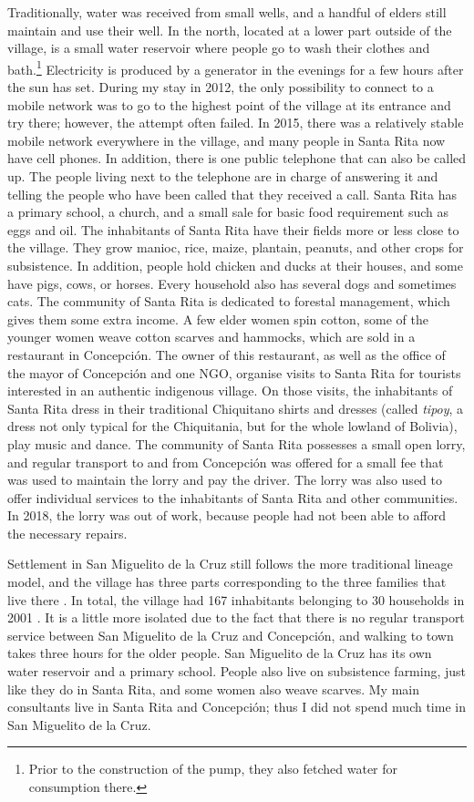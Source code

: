 Traditionally, water was received from small wells, and a handful of elders still maintain and use their well. In the north, located at a lower part outside of the village, is a small water reservoir where people go to wash their clothes and bath.\footnote{Prior to the construction of the pump, they also fetched water for consumption there.}   Electricity is produced by a generator in the evenings for a few hours after the sun has set. During my stay in 2012, the only possibility to connect to a mobile network was to go to the highest point of the village at its entrance and try there; however, the attempt often failed. In 2015, there was a relatively stable mobile network everywhere in the village, and many people in Santa Rita now have cell phones. In addition, there is one public telephone that can also be called up. The people living next to the telephone are in charge of answering it and telling the people who have been called that they received a call. Santa Rita has a primary school, a church, and a small sale for basic food requirement such as eggs and oil.
The inhabitants of Santa Rita have their fields more or less close to the village. They grow manioc, rice, maize, plantain, peanuts, and other crops for subsistence. In addition, people hold chicken and ducks at their houses, and some have pigs, cows, or horses. Every household also has several dogs and sometimes cats. The community of Santa Rita is dedicated to forestal management, which gives them some extra income. A few elder women spin cotton, some of the younger women weave cotton scarves and hammocks, which are sold in a restaurant in Concepción. The owner of this restaurant, as well as the office of the mayor of Concepción and one NGO, organise visits to Santa Rita for tourists interested in an authentic indigenous village. On those visits, the inhabitants of Santa Rita dress in their traditional Chiquitano shirts and dresses (called \textit{tipoy}, a dress not only typical for the Chiquitania, but for the whole lowland of Bolivia), play music and dance. 
The community of Santa Rita possesses a small open lorry, and regular transport to and from Concepción was offered for a small fee that was used to maintain the lorry and pay the driver. The lorry was also used to offer individual services to the inhabitants of Santa Rita and other communities. In 2018, the lorry was out of work, because people had not been able to afford the necessary repairs. 

Settlement in San Miguelito de la Cruz still follows the more traditional lineage model, and the village has three parts corresponding to the three families that live there \citep[6]{Villalta2013}. In total, the village had 167 inhabitants belonging to 30 households in 2001 \citep[]{INE2001}. It is a little more isolated due to the fact that there is no regular transport service between San Miguelito de la Cruz and Concepción, and walking to town takes three hours for the older people. San Miguelito de la Cruz has its own water reservoir and a primary school. People also live on subsistence farming, just like they do in Santa Rita, and some women also weave scarves. My main consultants  live in Santa Rita and Concepción; thus I did not spend much time in San Miguelito de la Cruz.


